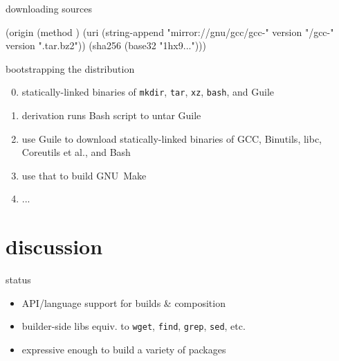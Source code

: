 \documentclass{beamer}
\begin{document}
\begin{frame}[fragile]{downloading sources}
  \begin{semiverbatim}
(\alert{origin}
  (method )
  (uri (string-append "mirror://gnu/gcc/gcc-"
                      version "/gcc-" version
                      ".tar.bz2"))
  (sha256 (base32 "1hx9\textrm{...}")))
  \end{semiverbatim}

\end{frame}

\begin{frame}[fragile]{bootstrapping the distribution}
  \begin{enumerate}
    \setcounter{enumi}{-1}
    \item<1-> statically-linked binaries of \texttt{mkdir}, \texttt{tar},
      \texttt{xz}, \texttt{bash}, and Guile
    \item<2-> derivation runs Bash script to untar Guile
    \item<3-> use Guile to download statically-linked binaries of GCC,
      Binutils, libc, Coreutils et al., and Bash
    \item<4-> use that to build GNU~Make
    \item<4-> ...
  \end{enumerate}
\end{frame}

\section{discussion}

\begin{frame}{status}
  \begin{itemize}
  \item API/language support for builds \& composition
  \item builder-side libs equiv. to \texttt{wget}, \texttt{find},
    \texttt{grep}, \texttt{sed}, etc.
  \item expressive enough to build a variety of packages
  \end{itemize}
\end{frame}
\end{document}
